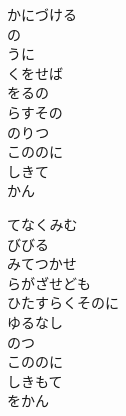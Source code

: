 \documentclass[10pt,b5j]{tarticle} %
\begin{document}
\begin{enumerate}
\begin{minipage}[c]{\blocksize}
        \vspace{\linespace}
        \item
        かにづける\\
        の\\
        うに\\
        くをせば\\
        をるの\\
        らすその\\
        のりつ\\
        こののに\\
        しきて\\
        かん
        
        \vspace{\linespace}
        \item
        てなくみむ\\
        びびる\\
        みてつかせ\\
        らがざせども\\
        ひたすらくそのに\\
        ゆるなし\\
        のつ\\
        こののに\\
        しきもて\\
        をかん
    
    \end{minipage}
\end{enumerate} %
\end{document}
